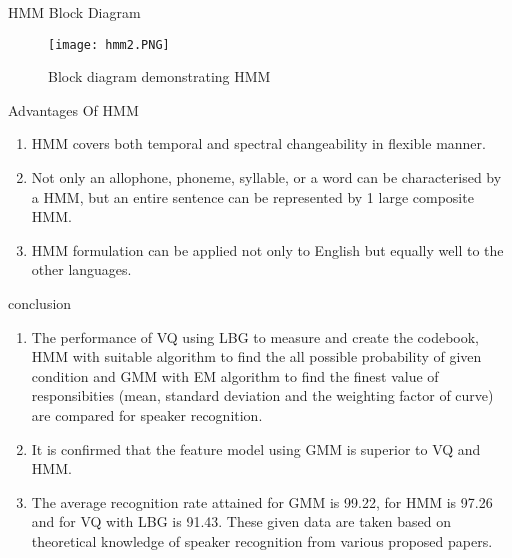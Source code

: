 \documentclass{beamer}
\begin{document}
\begin{frame}{HMM Block Diagram}
\begin{figure}
    \centering
    \texttt{[image: hmm2.PNG]}
    \caption{Block diagram demonstrating HMM}
    \end{figure}
    
\end{frame}
\begin{frame}{Advantages Of HMM}
\begin{block}{}
\begin{enumerate}
    \item HMM covers both temporal and spectral changeability in 
flexible manner.
\item Not only an allophone, phoneme, syllable, or a word
can be characterised by a HMM, but an entire sentence
can be represented by 1 large composite HMM.
\item HMM formulation can be applied not only to English
but equally well to the other languages.
\end{enumerate}
    
\end{block}
    
\end{frame}
\begin{frame}{conclusion}
\begin{block}{}
\begin{enumerate}
\item The performance of VQ using LBG to measure and create
the codebook, HMM with suitable algorithm to find the all
possible probability of given condition and GMM with EM
algorithm to find the finest value of responsibities (mean,
standard deviation and the weighting factor of curve) are
compared for speaker recognition. 
\item It is confirmed that the
feature model using GMM is superior to VQ and HMM.
\item The average recognition rate attained for
 GMM is 99.22,    for HMM is 97.26 and for VQ with
LBG is 91.43. These given data are taken based on
theoretical knowledge of speaker recognition from various
proposed papers.
\end{enumerate}
\end{block}


    
\end{frame}
\end{document}
